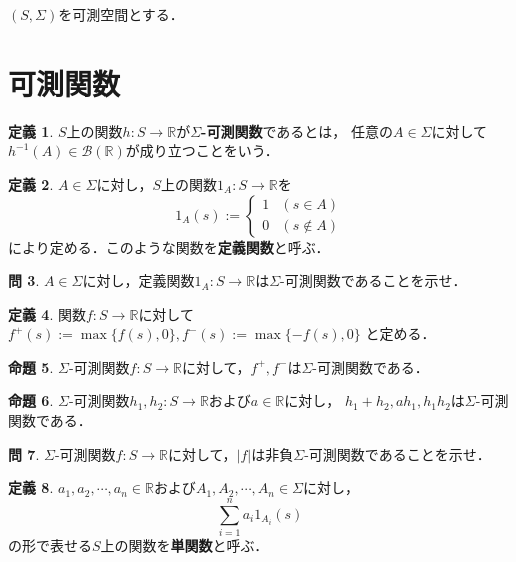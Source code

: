 \documentclass{jsreport}
\theoremstyle{definition}
\newtheorem{defi}{定義}[section]
\newtheorem{prop}[defi]{命題}
\newtheorem{qst}[defi]{問}
\begin{document}
$(S,\Sigma)$を可測空間とする．

\section{可測関数}

\begin{defi}\label{def_measurable_function}
$S$上の関数$h \colon S\to\mathbb{R}$が\textbf{$\Sigma$-可測関数}であるとは，
任意の$A\in\Sigma$に対して$h^{-1}(A)\in\mathcal{B}(\mathbb{R})$が成り立つことをいう．
\end{defi}

\begin{defi}\label{def_indicator_function}
$A\in\Sigma$に対し，$S$上の関数$1_A \colon S\to\mathbb{R}$を
\[ 1_A(s):=\begin{cases}1 & (s \in A) \\ 0 & (s \notin A)\end{cases} \]
により定める．このような関数を\textbf{定義関数}と呼ぶ．
\end{defi}

\begin{qst}\label{qst_indicator_function_is_measurable}
$A\in\Sigma$に対し，定義関数$1_A \colon S\to\mathbb{R}$は$\Sigma$-可測関数であることを示せ．
\end{qst}

\begin{defi}\label{def_positive_and_negative_part}
関数$f \colon S\to\mathbb{R}$に対して
$f^+(s):=\max\{f(s),0\}, f^-(s):=\max\{-f(s),0\}$
と定める．
\end{defi}

\begin{prop}\label{prop_positive_and_negative_part_are_measurable}
$\Sigma$-可測関数$f \colon S\to\mathbb{R}$に対して，$f^+,f^-$は$\Sigma$-可測関数である．
\end{prop}

\begin{prop}\label{prop_measurable_function_and_arithmetic}
$\Sigma$-可測関数$h_1,h_2 \colon S\to\mathbb{R}$および$a\in\mathbb{R}$に対し，
$h_1+h_2, ah_1, h_1h_2$は$\Sigma$-可測関数である．
\end{prop}

\begin{qst}\label{qst_absolute_is_measurable}
$\Sigma$-可測関数$f \colon S\to\mathbb{R}$に対して，$|f|$は非負$\Sigma$-可測関数であることを示せ．
\end{qst}

\begin{defi}\label{def_simple_function}
$a_1,a_2,\cdots,a_n\in\mathbb{R}$および$A_1,A_2,\cdots,A_n\in\Sigma$に対し，
\[ \sum_{i=1}^n a_i1_{A_i}(s) \]
の形で表せる$S$上の関数を\textbf{単関数}と呼ぶ．
\end{defi}
\end{document}
